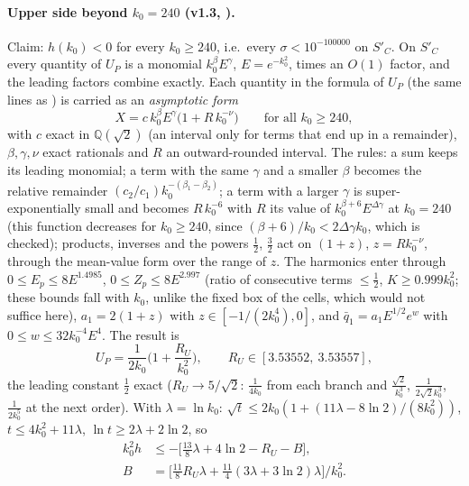 \paragraph*{Upper side beyond $k_0=240$ (v1.3, ).}
Claim: $h(k_0)<0$ for every $k_0\ge240$, i.e.\ every $\sigma<10^{-100000}$ on $S'_C$. On $S'_C$ every quantity of $U_P$ is a monomial $k_0^\beta E^\gamma$, $E=e^{-k_0^2}$,
times an $O(1)$ factor, and the leading factors combine exactly. Each quantity in the formula of $U_P$ (the same lines as ) is
carried as an \emph{asymptotic form}
\begin{equation*}
X=c\,k_0^{\beta}E^{\gamma}\big(1+R\,k_0^{-\nu}\big)\qquad\text{for all }k_0\ge240,
\end{equation*}
with $c$ exact in $\mathbb Q(\sqrt2)$ (an interval only for terms that end up in a remainder), $\beta,\gamma,\nu$ exact rationals and $R$ an outward-rounded interval.
The rules: a sum keeps its leading monomial; a term with the same $\gamma$ and a smaller $\beta$ becomes the relative remainder $(c_2/c_1)k_0^{-(\beta_1-\beta_2)}$; a term with a
larger $\gamma$ is super-exponentially small and becomes $R\,k_0^{-6}$ with $R$ its value of $k_0^{\beta+6}E^{\Delta\gamma}$ at $k_0=240$ (this function decreases
for $k_0\ge240$, since $(\beta+6)/k_0<2\Delta\gamma k_0$, which is checked); products, inverses and the powers $\frac12$, $\frac32$ act on $(1+z)$, $z=Rk_0^{-\nu}$, through
the mean-value form over the range of $z$. The harmonics enter through $0\le E_p\le8E^{1.4985}$, $0\le Z_p\le8E^{2.997}$ (ratio of consecutive terms $\le\frac12$,
$K\ge0.999k_0^2$; these bounds fall with $k_0$, unlike the fixed box of the cells, which would not suffice here), $a_1=2(1+z)$ with $z\in[-1/(2k_0^4),0]$, and $\bar q_1=a_1E^{1/2}e^{w}$ with $0\le w\le32k_0^{-4}E^4$. The result is
\begin{equation*}
U_P=\frac1{2k_0}\Big(1+\frac{R_U}{k_0^2}\Big),\qquad R_U\in[3.53552,\ 3.53557],
\end{equation*}
the leading constant $\frac12$ exact ($R_U\to5/\sqrt2$: $\frac1{4k_0}$ from each branch and $\frac{\sqrt2}{k_0^3}$, $\frac1{2\sqrt2k_0^3}$, $\frac1{2k_0^5}$ at the next order).
With $\lambda=\ln k_0$: $\sqrt t\le2k_0(1+(11\lambda-8\ln2)/(8k_0^2))$, $t\le4k_0^2+11\lambda$, $\ln t\ge2\lambda+2\ln2$, so
\begin{equation*}
\begin{aligned}
k_0^2h&\le-\Big[\tfrac{13}8\lambda+4\ln2-R_U-B\Big],\\
B&=\Big[\tfrac{11}8R_U\lambda+\tfrac{11}4(3\lambda+3\ln2)\lambda\Big]\Big/k_0^2 .
\end{aligned}
\end{equation*}
